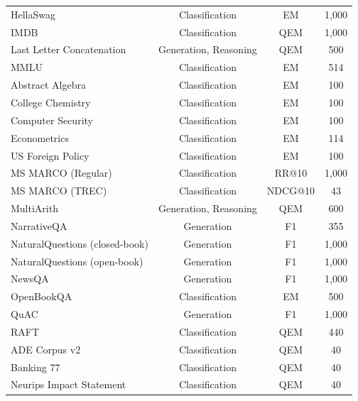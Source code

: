 \begin{table}[htbp]
{\begin{tabular}{lccc}
HellaSwag \citep{zellers2019hellaswag} &Classification &EM &1,000 \\
IMDB \citep{maas-etal-2011-learning} &Classification &QEM &1,000 \\
Last Letter Concatenation \citep{wei2023chainofthought} & Generation, Reasoning &QEM &500 \\
MMLU \citep{hendrycks2021measuring} & Classification&EM &514 \\
\hspace{0.5cm}Abstract Algebra &Classification &EM &100 \\
\hspace{0.5cm}College Chemistry &Classification &EM &100 \\
\hspace{0.5cm}Computer Security &Classification &EM &100 \\
\hspace{0.5cm}Econometrics &Classification &EM &114 \\
\hspace{0.5cm}US Foreign Policy &Classification &EM &100 \\
MS MARCO (Regular) \citep{bajaj2018ms} & Classification & RR@10 & 1,000\\
MS MARCO (TREC) \citep{bajaj2018ms} & Classification & NDCG@10 & 43\\
MultiArith \citep{roy2016solving} & Generation, Reasoning &QEM &600 \\
NarrativeQA \citep{kocisky-etal-2018-narrativeqa} &Generation &F1 &355 \\
NaturalQuestions (closed-book) \citep{kwiatkowski-etal-2019-natural} &Generation &F1 &1,000 \\
NaturalQuestions (open-book) &Generation &F1 &1,000 \\
NewsQA \citep{trischler2017newsqa} &Generation &F1 &1,000 \\
OpenBookQA \citep{Mihaylov2018CanAS} &Classification &EM &500 \\
QuAC \citep{choi-etal-2018-quac} &Generation &F1 &1,000 \\
RAFT \citep{alex2022raft} & Classification &QEM &440 \\
\hspace{0.5cm}ADE Corpus v2 &Classification &QEM &40 \\
\hspace{0.5cm}Banking 77 &Classification &QEM &40 \\
\hspace{0.5cm}Neurips Impact Statement &Classification &QEM &40 \\

\end{tabular}}
\end{table}
